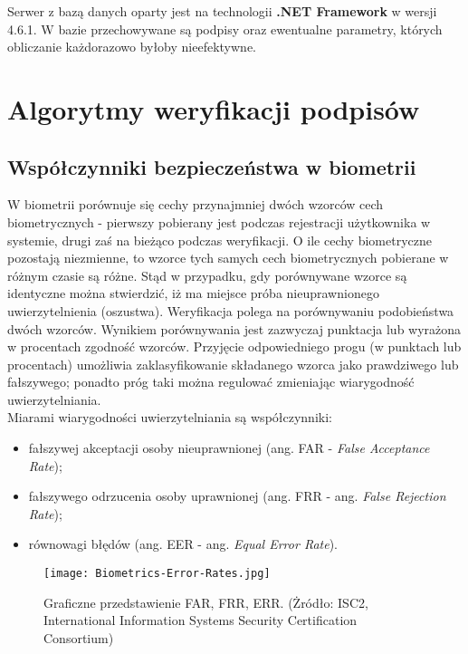 \documentclass[notitlepage, oneside]{report}
\begin{document}
Serwer z bazą danych oparty jest na technologii \textbf{.NET Framework} w wersji 4.6.1. W bazie przechowywane są podpisy oraz ewentualne parametry, których obliczanie każdorazowo byłoby nieefektywne.



\chapter*{Algorytmy weryfikacji podpisów}


 \section*{Współczynniki bezpieczeństwa w biometrii}
 W biometrii porównuje się cechy przynajmniej dwóch wzorców cech biometrycznych - pierwszy pobierany jest podczas rejestracji użytkownika w systemie, drugi zaś na bieżąco podczas weryfikacji. O ile cechy biometryczne pozostają niezmienne, to wzorce tych samych cech biometrycznych pobierane w różnym czasie są różne. Stąd w przypadku, gdy porównywane wzorce są identyczne można stwierdzić, iż ma miejsce próba nieuprawnionego uwierzytelnienia (oszustwa). Weryfikacja polega na porównywaniu podobieństwa dwóch wzorców. Wynikiem porównywania jest zazwyczaj punktacja lub wyrażona w procentach zgodność wzorców. Przyjęcie odpowiedniego progu (w punktach lub procentach) umożliwia zaklasyfikowanie składanego wzorca jako prawdziwego lub fałszywego; ponadto próg taki można regulować zmieniając wiarygodność uwierzytelniania. \\
 
Miarami wiarygodności uwierzytelniania są współczynniki:
  \begin{itemize}
      \item fałszywej akceptacji osoby nieuprawnionej (ang. FAR - \textit{False Acceptance Rate});
      \item fałszywego odrzucenia osoby uprawnionej (ang. FRR - ang. \textit{False Rejection Rate});
      \item równowagi błędów (ang. EER - ang. \textit{Equal Error Rate}).
  \end{itemize}
  
\begin{figure}
\centering
\texttt{[image: Biometrics-Error-Rates.jpg]}
\caption{Graficzne przedstawienie FAR, FRR, ERR. (Żródło: ISC2, International Information Systems Security Certification Consortium)}
\end{figure}
\end{document}
